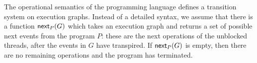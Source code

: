 
The operational semantics of the programming language defines a transition system on execution graphs.
Instead of a detailed syntax, we assume that there is a function $\mathsf{next}_P(G)$ which takes
an execution graph and returns a 
set of possible next events from the program $P$: these are the next operations
of the unblocked threads, after the events in $G$ have transpired.
If $\mathsf{next}_P(G)$ is empty, then there are no remaining operations and the program has terminated. 


